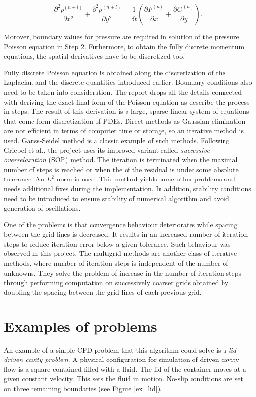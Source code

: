 \begin{equation} \label{eq:poisson}
	\frac{\partial^2 p^{(n+l)}}{\partial x^2}+\frac{\partial^2 p^{(n+l)}}{\partial y^2} = \frac{1}{\delta t} \left( \frac{\partial F^{(n)}}{\partial x} + \frac{\partial G^{(n)}}{\partial y} \right).
\end{equation}

Morover, boundary values for pressure are required in solution of the pressure Poisson equation in Step 2. Furhermore, to obtain the fully discrete momentum equations, the spatial derivatives have to be discretized too. 

Fully discrete Poisson equation is obtained along the discretization of the Laplacian and the discrete quantities introduced earlier. Boundary conditions also need to be taken into consideration. The report drops all the details connected with deriving the exact final form of the Poisson equation as \cite{griebel1998numerical} describe the process in steps. The result of this derivation is a large, sparse linear system of equations that come form discretization of PDEs. Direct methods as Gaussian elimination are not efficient in terms of computer time or storage, so an iterative method is used. Gauss-Seidel method is a classic example of such methods. Following Griebel et al., the project uses its improved variant called \emph{successive overrelaxation} (SOR) method. The iteration is terminated when the maximal number of steps is reached or when the of the residual is under some absolute tolerance. An $L^2$-norm is used. This method yields some other problems and needs additional fixes during the implementation. In addition, stability conditions need to be introduced to ensure stability of numerical algorithm and avoid generation of oscillations.

One of the problems is that convergence behaviour deteriorates while spacing between the grid lines is decreased. It results in an increased number of iteration steps to reduce iteration error below a given tolerance. Such behaviour was observed in this project. The multigrid methods are another class of iterative methods, where number of iteration steps is independent of the number of unknowns. They solve the problem of increase in the number of iteration steps through performing computation on successively coarser grids obtained by doubling the spacing between the grid lines of each previous grid.

\section{Examples of problems}
An example of a simple CFD problem that this algorithm could solve is a \emph{lid-driven cavity problem}. A physical configuration for simulation of driven cavity flow is a square contained filled with a fluid. The lid of the container moves at a given constant velocity. This sets the fluid in motion. No-slip conditions are set on three remaining boundaries (see Figure \ref{ex_lid}). 

